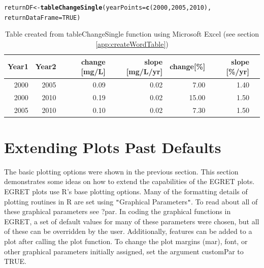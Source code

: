 \documentclass[a4paper,11pt]{article}\usepackage[]{graphicx}\usepackage[]{color}
\makeatletter
\newcommand{\hlnum}[1]{\textcolor[rgb]{0.686,0.059,0.569}{#1}}%
\newcommand{\hlstd}[1]{\textcolor[rgb]{0.345,0.345,0.345}{#1}}%
\newcommand{\hlkwb}[1]{\textcolor[rgb]{0.69,0.353,0.396}{#1}}%
\newcommand{\hlkwc}[1]{\textcolor[rgb]{0.333,0.667,0.333}{#1}}%
\newcommand{\hlkwd}[1]{\textcolor[rgb]{0.737,0.353,0.396}{\textbf{#1}}}%
\newenvironment{kframe}{%
 \def\at@end@of@kframe{}%
 \ifinner\ifhmode%
  \def\at@end@of@kframe{\end{minipage}}%
  \begin{minipage}{\columnwidth}%
 \fi\fi%
 \def\FrameCommand##1{\hskip\@totalleftmargin \hskip-\fboxsep
 \colorbox{shadecolor}{##1}\hskip-\fboxsep
     \hskip-\linewidth \hskip-\@totalleftmargin \hskip\columnwidth}%
 \MakeFramed {\advance\hsize-\width
   \@totalleftmargin\z@ \linewidth\hsize
   \@setminipage}}%
 {\par\unskip\endMakeFramed%
 \at@end@of@kframe}
\newenvironment{knitrout}{}{} %
\makeatother
\begin{document}
\begin{knitrout}
\color{fgcolor}\begin{kframe}
\begin{alltt}
\hlstd{returnDF} \hlkwb{<-} \hlkwd{tableChangeSingle}\hlstd{(}\hlkwc{yearPoints}\hlstd{=}\hlkwd{c}\hlstd{(}\hlnum{2000}\hlstd{,}\hlnum{2005}\hlstd{,}\hlnum{2010}\hlstd{),}
                              \hlkwc{returnDataFrame}\hlstd{=}\hlnum{TRUE}\hlstd{)}
\end{alltt}
\end{kframe}
\end{knitrout}


\begin{table}[ht]
\centering
\begin{tabular}{rrrrrrr}
  \hline
Year1 & Year2 & change [mg/L] & slope [mg/L/yr] & change[\%] & slope [\%/yr] \\ 
  \hline
2000 & 2005 & 0.09 & 0.02 & 7.00 & 1.40 \\ 
2000 & 2010 & 0.19 & 0.02 & 15.00 & 1.50 \\ 
2005 & 2010 & 0.10 & 0.02 & 7.30 & 1.50 \\ 
   \hline
\end{tabular}
\caption{Table created from tableChangeSingle function using Microsoft Excel (see section \ref{app:createWordTable})} 
\label{table:tableChangeSingle}
\end{table}


\clearpage

\FloatBarrier


\section{Extending Plots Past Defaults}
\label{sec:extendedPlots}

\FloatBarrier

The basic plotting options were shown in the previous section.  This section demonstrates some ideas on how to extend the capabilities of the EGRET plots. EGRET plots use R's base plotting options. Many of the formatting details of plotting routines in R are set using \texttt{"}Graphical Parameters\texttt{"}.  To read about all of these graphical parameters see ?par.  In coding the graphical functions in EGRET, a set of default values for many of these parameters were chosen, but all of these can be overridden by the user. Additionally, features can be added to a plot after calling the plot function. To change the plot margins (mar), font, or other graphical parameters initially assigned, set the argument customPar to TRUE.
\end{document}
